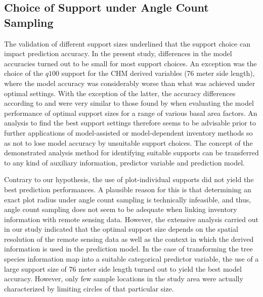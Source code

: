 \subsection{Choice of Support under Angle Count Sampling}
\label{sec:supp_choice_dis}

The validation of different support sizes underlined that the support choice can impact prediction accuracy. In the present study, differences in the model accuracies turned out to be small for most support choices. An exception was the choice of the $q100$ support for the CHM derived variables (76 meter side length), where the model accuracy was considerably worse than what was achieved under optimal settings. With the exception of the latter, the accuracy differences according to \adjrsq{} and \rmsecv{} were very similar to those found by \citet{deo2016} when evaluating the model performance of optimal support sizes for a range of various basal area factors. An analysis to find the best support settings therefore seems to be advisable prior to further applications of model-assisted or model-dependent inventory methods so as not to lose model accuracy by unsuitable support choices. The concept of the demonstrated analysis method for identifying suitable supports can be transferred to any kind of auxiliary information, predictor variable and prediction model.\par
Contrary to our hypothesis, the use of plot-individual supports did not yield the best prediction performances. A plausible reason for this is that determining an exact plot radius under angle count sampling is technically infeasible, and thus, angle count sampling does not seem to be adequate when linking inventory information with remote sensing data. However, the extensive analysis carried out in our study indicated that the optimal support size depends on the spatial resolution of the remote sensing data as well as the context in which the derived information is used in the prediction model. In the case of transforming the tree species information map into a suitable categorical predictor variable, the use of a large support size of 76 meter side length turned out to yield the best model accuracy. However, only few sample locations in the study area were actually characterized by limiting circles of that particular size.
